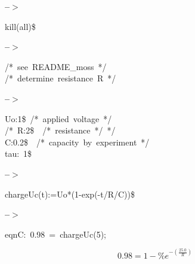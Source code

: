 \documentclass[fleqn]{article}
\begin{document}
\noindent
\begin{minipage}[t]{4.000000em}\color{red}\bfseries
 --\ensuremath{\ensuremath{>}}	
\end{minipage}
\begin{minipage}[t]{\textwidth}\color{blue}
kill(all)\$
\end{minipage}

\noindent%



\noindent
\begin{minipage}[t]{4.000000em}\color{red}\bfseries
 --\ensuremath{\ensuremath{>}}	
\end{minipage}
\begin{minipage}[t]{\textwidth}\color{blue}
/*\ see\ README\_moss\ */\\
/*\ determine\ resistance\ R\ */
\end{minipage}

\noindent%



\noindent
\begin{minipage}[t]{4.000000em}\color{red}\bfseries
 --\ensuremath{\ensuremath{>}}	
\end{minipage}
\begin{minipage}[t]{\textwidth}\color{blue}
Uo:1\$\ /*\ applied\ voltage\ */\\
/*\ R:2\$\ \ /*\ resistance\ */\ */\\
C:0.2\$\ \ /*\ capacity\ by\ experiment\ */\\
tau:\ 1\$
\end{minipage}

\noindent%



\noindent
\begin{minipage}[t]{4.000000em}\color{red}\bfseries
 --\ensuremath{\ensuremath{>}}	
\end{minipage}
\begin{minipage}[t]{\textwidth}\color{blue}
chargeUc(t):=Uo*(1-exp(-t/R/C))\$
\end{minipage}

\noindent%



\noindent
\begin{minipage}[t]{4.000000em}\color{red}\bfseries
 --\ensuremath{\ensuremath{>}}	
\end{minipage}
\begin{minipage}[t]{\textwidth}\color{blue}
eqnC:\ 0.98\ =\ chargeUc(5);
\end{minipage}
\[\displaystyle \tag{eqnC} 
0.98\mathop{=}1\mathop{-}{{\% e}^{-\left( \frac{25.0}{R}\right) }}\mbox{}
\]
\end{document}
